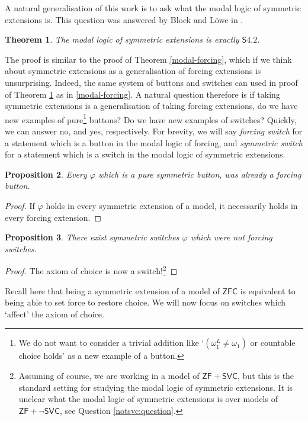 \documentclass[a4paper,11pt]{amsart}
\newtheorem{theorem}{Theorem}[section]
\newtheorem{prop}[theorem]{Proposition}
\theoremstyle{definition}
\newcommand{\ZF}{\mathsf{ZF}}
\newcommand{\ZFC}{\mathsf{ZFC}}
\newcommand{\SVC}{\mathsf{SVC}}
\newcommand{\Sf}{\mathsf{S}4.2}
\begin{document}
A natural generalisation of this work is to ask what the modal logic of symmetric extensions is. This question was answered by Block and Löwe in \cite{LB}. 

\begin{theorem}\label{modal-symmetric}
    The modal logic of symmetric extensions is exactly $\Sf$. 
\end{theorem}

The proof is similar to the proof of Theorem \ref{modal-forcing}, which if we think about symmetric extensions as a generalisation of forcing extensions is unsurprising. Indeed, the same system of buttons and switches can used in proof of Theorem \ref{modal-symmetric} as in \ref{modal-forcing}. A natural question therefore is if taking symmetric extensions is a generalisation of taking forcing extensions, do we have new examples of pure\footnote{We do not want to consider a trivial addition like `$(\omega_1^L \neq \omega_1)$ or countable choice holds' as a new example of a button.} buttons? Do we have new examples of switches? Quickly, we can answer no, and yes, respectively. For brevity, we will say \emph{forcing switch} for a statement which is a button in the modal logic of forcing, and \emph{symmetric switch} for a statement which is a switch in the modal logic of symmetric extensions. 

\begin{prop}
    Every $\varphi$ which is a pure symmetric button, was already a forcing button.
\end{prop}

\begin{proof}
    If $\varphi$ holds in every symmetric extension of a model, it necessarily holds in every forcing extension. 
\end{proof}


\begin{prop}
    There exist symmetric switches $\varphi$ which were not forcing switches.
\end{prop}

\begin{proof}
    The axiom of choice is now a switch!\footnote{Assuming of course, we are working in a model of $\ZF + \SVC$, but this is the standard setting for studying the modal logic of symmetric extensions. It is unclear what the modal logic of symmetric extensions is over models of $\ZF + \neg\SVC$, see Question \ref{notsvc:question}.}  
\end{proof}

Recall here that being a symmetric extension of a model of $\ZFC$ is equivalent to being able to set force to restore choice. We will now focus on switches which `affect' the axiom of choice. 
\end{document}
